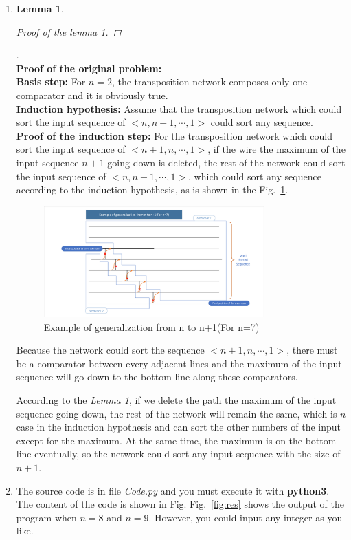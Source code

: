 \documentclass[12pt,a4paper]{article}
\makeatletter
\newtheorem{lemma}[theorem]{Lemma}
\newtheorem*{solution}{Solution}
\theoremstyle{definition}
\renewenvironment{solution}[1][Solution] {\par\pushQED{\qed}\normalfont\topsep6\p@\@plus6\p@\relax\trivlist\item[\hskip\labelsep\bfseries#1\@addpunct{.}]\ignorespaces}{\popQED\endtrivlist\@endpefalse} \makeatother
\makeatother
\begin{document}
\begin{enumerate}
\begin{solution}
\begin{lemma}
\begin{proof}[Proof of the lemma 1]
\end{proof}
\end{lemma}
.\\
{\Large \textbf{Proof of the original problem:}}\\
\textbf{Basis step:} For $n=2$, the transposition network composes only one comparator and it is obviously true.
\\
\textbf{Induction hypothesis:} Assume that the transposition network which could sort the input sequence of $<n,n-1,\cdots,1>$ could sort any sequence. 
\\
\textbf{Proof of the induction step:} For the transposition network which could sort the input sequence of $<n+1,n,\cdots,1>$, if the wire the maximum of the input sequence $n+1$ going down is deleted, the rest of the network could sort the input sequence of $<n,n-1,\cdots,1>$, which could sort any sequence according to the induction hypothesis, as is shown in the Fig.~\ref{Fig-BigDeleteExample}.

\begin{figure}[htbp]
    \centering
    \includegraphics[width=0.8\textwidth]{Fig-BigDeleteExample.pdf}
    \caption{Example of generalization from n to n+1(For n=7)}\label{Fig-BigDeleteExample}
\end{figure}

Because the network could sort the sequence $<n+1,n,\cdots,1>$, there must be a comparator between every adjacent lines and the maximum of the input sequence will go down to the bottom line along these comparators. 

According to the \textit{Lemma 1}, if we delete the path the maximum of the input sequence going down, the rest of the network will remain the same, which is $n$ case in the induction hypothesis and can sort the other numbers of the input except for the maximum. At the same time, the maximum is on the bottom line eventually, so the network could sort any input sequence with the size of $n+1$. 
\end{solution}
\item
The source code is in file \textit{Code.py} and you must execute it with \textbf{python3}. The content of the code is shown in Fig.
Fig.~\ref{fig:res} shows the output of the program when $n=8$ and $n=9$. However, you could input any integer as you like.


\end{enumerate}
\end{document}
